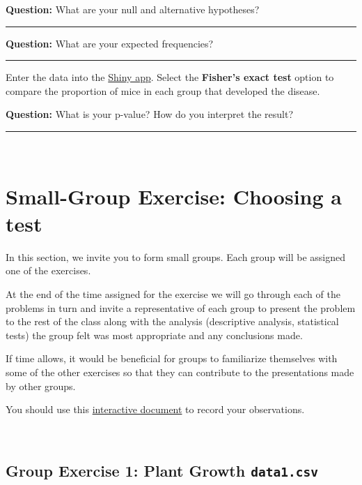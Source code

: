 \documentclass[]{article}
\begin{document}
{\textbf{Question:}} What are your null and alternative hypotheses?

\begin{center}\rule{0.5\linewidth}{\linethickness}\end{center}

{\textbf{Question:}} What are your expected frequencies?

\begin{center}\rule{0.5\linewidth}{\linethickness}\end{center}

Enter the data into the
\href{http://bioinformatics.cruk.cam.ac.uk/stats/contingency-table/}{Shiny
app}. Select the \textbf{Fisher's exact test} option to compare the
proportion of mice in each group that developed the disease.

{\textbf{Question:}} What is your p-value? How do you interpret the
result?

\begin{center}\rule{0.5\linewidth}{\linethickness}\end{center}

~

\hypertarget{small-group-exercise-choosing-a-test}{%
\section{Small-Group Exercise: Choosing a
test}\label{small-group-exercise-choosing-a-test}}

In this section, we invite you to form small groups. Each group will be
assigned one of the exercises.

At the end of the time assigned for the exercise we will go through each
of the problems in turn and invite a representative of each group to
present the problem to the rest of the class along with the analysis
(descriptive analysis, statistical tests) the group felt was most
appropriate and any conclusions made.

If time allows, it would be beneficial for groups to familiarize
themselves with some of the other exercises so that they can contribute
to the presentations made by other groups.

You should use this
\href{https://public.etherpad-mozilla.org/p/2019-02-12-intro-to-stats}{interactive
document} to record your observations.

~

\hypertarget{group-exercise-1-plant-growth-data1.csv}{%
\subsection{\texorpdfstring{Group Exercise 1: Plant Growth
\texttt{data1.csv}}{Group Exercise 1: Plant Growth data1.csv}}\label{group-exercise-1-plant-growth-data1.csv}}
\end{document}
